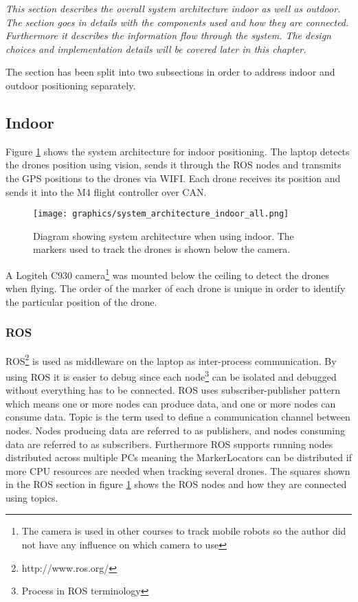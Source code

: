 \textit{This section describes the overall system architecture indoor as well as outdoor. The section goes in details with the components used and how they are connected. Furthermore it describes the information flow through the system. The design choices and implementation details will be covered later in this chapter.}

The section has been split into two subsections in order to address indoor and outdoor positioning separately.

\subsection{Indoor} \label{sec:system_architecture_indoor}
Figure \ref{fig:indoor_information_flow} shows the system architecture for indoor positioning. The laptop detects the drones position using vision, sends it through the ROS nodes and transmits the GPS positions to the drones via WIFI.
Each drone receives its position and sends it into the M4 flight controller over \ac{CAN}.
\begin{figure}[H]
    \center
    \texttt{[image: graphics/system\_architecture\_indoor\_all.png]}
    \caption{Diagram showing system architecture when using indoor. The markers used to track the drones is shown below the camera.}
    \label{fig:indoor_information_flow}
\end{figure} 

A Logiteh C930 camera\footnote{The camera is used in other courses to track mobile robots so the author did not have any influence on which camera to use} was mounted below the ceiling to detect the drones when flying. The order of the marker of each drone is unique in order to identify the particular position of the drone.


\subsubsection*{ROS}
\ac{ROS}\footnote{http://www.ros.org/} is used as middleware on the laptop as inter-process communication. By using ROS it is easier to debug since each node\footnote{Process in \ac{ROS} terminology} can be isolated and debugged without everything has to be connected. \ac{ROS} uses subscriber-publisher pattern which means one or more nodes can produce data, and one or more nodes can consume data. Topic is the term used to define a communication channel between nodes. Nodes producing data are referred to as publishers, and nodes consuming data are referred to as subscribers.
Furthermore \ac{ROS} supports running nodes distributed across multiple PCs meaning the MarkerLocators can be distributed if more CPU resources are needed when tracking several drones.
The squares shown in the \ac{ROS} section in figure \ref{fig:indoor_information_flow} shows the \ac{ROS} nodes and how they are connected using topics.


